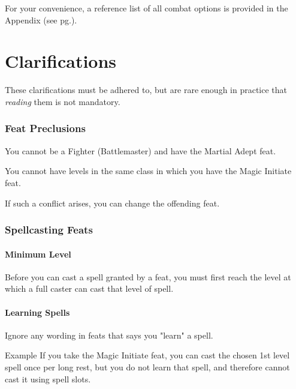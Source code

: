 \documentclass[letterpaper,twocolumn,openany,nodeprecatedcode]{dndbook}
\newcommand{\pg}[1]{pg.\pageref{#1}}
\newcommand{\see}[1]{(see \pg{#1})}
\begin{document}
For your convenience, a reference list of all combat options is provided in the Appendix \see{combat-options}.















\chapter{Clarifications}

\noindent These clarifications must be adhered to, but are rare enough in practice that \textit{reading} them is not mandatory.

\subsection{Feat Preclusions}
You cannot be a Fighter (Battlemaster) and have the Martial Adept feat.

You cannot have levels in the same class in which you have the Magic Initiate feat.

If such a conflict arises, you can change the offending feat.

\subsection{Spellcasting Feats}

\subsubsection{Minimum Level}
Before you can cast a spell granted by a feat, you must first reach the level at which a full caster can cast that level of spell.

\subsubsection{Learning Spells}
Ignore any wording in feats that says you "learn" a spell.

\begin{DndComment}{Example}
If you take the Magic Initiate feat, you can cast the chosen 1st level spell once per long rest, but you do not learn that spell, and therefore cannot cast it using spell slots.
\end{DndComment}
\end{document}
